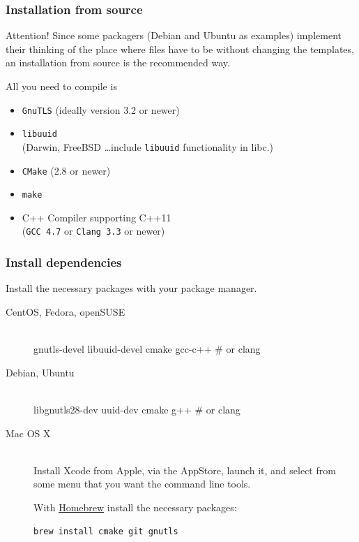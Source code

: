 \documentclass[t,handout]{beamer}
\begin{document}
\begin{frame}[fragile]\frametitle{Installation from source}

    \begin{alertblock}{Attention!}
        Since some packagers (Debian and Ubuntu as examples) implement their thinking of the place where files have to be without changing the templates, an installation from source is the recommended way.
    \end{alertblock} \pause

    All you need to compile is
    \begin{itemize}
        \item \verb+GnuTLS+ (ideally version 3.2 or newer)
        \item \verb+libuuid+ \\
            {\small (Darwin, FreeBSD \ldots include \verb+libuuid+ functionality in libc.)}
        \item \verb+CMake+ (2.8 or newer)
        \item \verb+make+
        \item C++ Compiler supporting C++11 \\
            {\small (\verb+GCC 4.7+ or \verb+Clang 3.3+ or newer)}
    \end{itemize}
\end{frame}

\begin{frame}[fragile]\frametitle{Install dependencies}
    Install the necessary packages with your package manager.

    \begin{description}
        \item[CentOS, Fedora, openSUSE] \hfill \\
            gnutls-devel libuuid-devel cmake gcc-c++ \# or clang
        \item[Debian, Ubuntu] \hfill \\
            libgnutls28-dev uuid-dev cmake g++ \# or clang
        \item[Mac OS X] \hfill \\
            Install Xcode from Apple, via the AppStore, launch it, and select from some menu that you want the command line tools.

            With \href{http://brew.sh/}{Homebrew} install the necessary packages:

            \verb=brew install cmake git gnutls=
    \end{description}

\end{frame}
\end{document}
